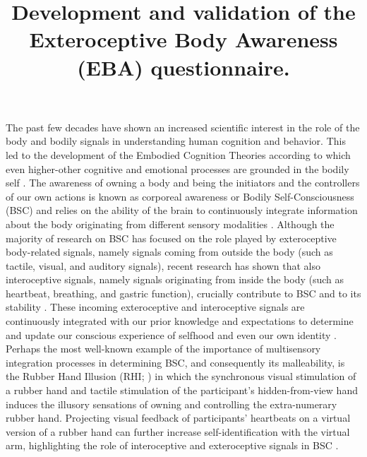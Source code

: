 \documentclass[man]{apa7}
\title{Development and validation of the Exteroceptive Body Awareness (EBA) questionnaire.}
\begin{document}
\setlength{\parindent}{10ex}
\maketitle
\noindent The past few decades have shown an increased scientific interest in the role of the body and bodily signals in understanding human cognition and behavior. This led to the development of the Embodied Cognition Theories according to which even higher-other cognitive and emotional processes are grounded in the bodily self \parencite{goldman2009social}. The awareness of owning a body and being the initiators and the controllers of our own actions is known as corporeal awareness \parencite{berlucchi2010body} or Bodily Self-Consciousness (BSC) and relies on the ability of the brain to continuously integrate information about the body originating from different sensory modalities \parencite{blanke2012multisensory}. Although the majority of research on BSC has focused on the role played by exteroceptive body-related signals, namely signals coming from outside the body (such as tactile, visual, and auditory signals), recent research has shown that also interoceptive signals, namely signals originating from inside the body (such as heartbeat, breathing, and gastric function), crucially contribute to BSC \parencite{herbert2012body} and to its stability \parencite{monti2021inside}. These incoming exteroceptive and interoceptive signals are continuously integrated with our prior knowledge and expectations to determine and update our conscious experience of selfhood and even our own identity \parencite{aspell2011multisensory,clark2013whatever,ehrsson201243,park2019coupling,porciello2018enfacement,seth2013interoceptive,seth2016active}. Perhaps the most well-known example of the importance of multisensory integration processes in determining BSC, and consequently its malleability, is the Rubber Hand Illusion (RHI; \Textcite{botvinick1998rubber}) in which the synchronous visual stimulation of a rubber hand and tactile stimulation of the participant’s hidden-from-view hand induces the illusory sensations of owning and controlling the extra-numerary rubber hand. Projecting visual feedback of participants’ heartbeats on a virtual version of a rubber hand can further increase self-identification with the virtual arm, highlighting the role of interoceptive and exteroceptive signals in BSC \parencite{suzuki2013multisensory}.
\end{document}
